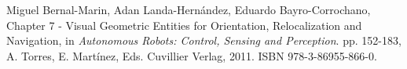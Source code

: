 
\begin{bibsection}
  \item Miguel Bernal-Marin, Adan Landa-Hernández, Eduardo Bayro-Corrochano,
        Chapter 7 - Visual Geometric Entities for Orientation,
        Relocalization and Navigation,
        in \emph{Autonomous Robots: Control, Sensing and Perception}.
        pp. 152-183, A. Torres, E. Martínez, Eds. Cuvillier Verlag, 2011.
        ISBN 978-3-86955-866-0.
\end{bibsection}
